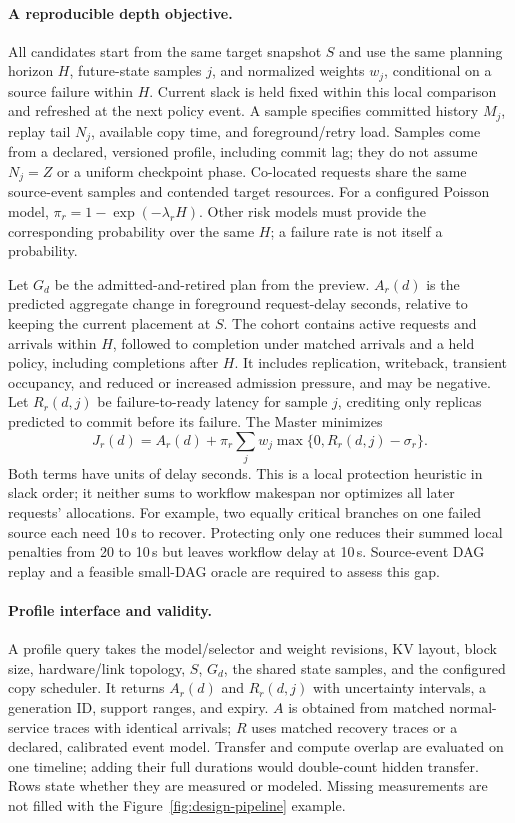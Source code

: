 \paragraph{A reproducible depth objective.}
All candidates start from the same target snapshot $S$ and use the same
planning horizon $H$, future-state samples $j$, and normalized weights $w_j$,
conditional on a source failure within $H$. Current slack is held fixed
within this local comparison and refreshed at the next policy event.
A sample specifies committed history $M_j$, replay tail $N_j$, available
copy time, and foreground/retry load. Samples come from a declared,
versioned profile, including commit lag; they do not assume $N_j=Z$ or
a uniform checkpoint phase. Co-located requests share the same source-event
samples and contended target resources. For a configured Poisson model,
$\pi_r=1-\exp(-\lambda_r H)$. Other risk models must provide the corresponding
probability over the same $H$; a failure rate is not itself a probability.

Let $G_d$ be the admitted-and-retired plan from the preview.
$A_r(d)$ is the predicted aggregate change in foreground request-delay
seconds, relative to keeping the current placement at $S$. The cohort
contains active requests and arrivals within $H$, followed to completion
under matched arrivals and a held policy, including completions after $H$.
It includes replication, writeback, transient occupancy, and reduced or
increased admission pressure, and may be negative. Let $R_r(d,j)$ be
failure-to-ready latency for sample $j$, crediting only replicas predicted
to commit before its failure. The Master minimizes
\begin{equation}
 J_r(d)=A_r(d)+\pi_r\sum_j w_j
          \max\{0,R_r(d,j)-\sigma_r\}.
 \label{eq:depth-score}
\end{equation}
Both terms have units of delay seconds. This is a local protection
heuristic in slack order; it neither sums to workflow makespan nor
optimizes all later requests' allocations.
For example, two equally critical branches on one failed source each
need 10\,s to recover. Protecting only one reduces their summed local
penalties from 20 to 10\,s but leaves workflow delay at 10\,s. Source-event
DAG replay and a feasible small-DAG oracle are required to assess this gap.

\paragraph{Profile interface and validity.}
A profile query takes the model/selector and weight revisions, KV layout,
block size, hardware/link topology, $S$, $G_d$, the shared state samples,
and the configured copy scheduler. It returns $A_r(d)$ and $R_r(d,j)$
with uncertainty intervals, a generation ID, support ranges, and expiry.
$A$ is obtained from matched normal-service traces with identical arrivals;
$R$ uses matched recovery traces or a declared, calibrated event model.
Transfer and compute overlap are evaluated on one timeline; adding their
full durations would double-count hidden transfer. Rows state whether
they are measured or modeled. Missing measurements are not filled with
the Figure~\ref{fig:design-pipeline} example.

